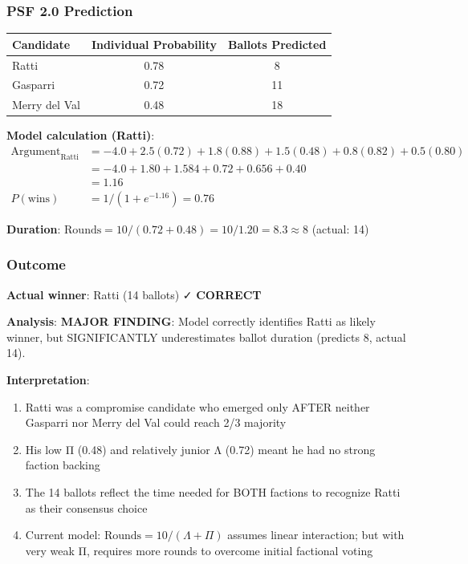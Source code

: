 \subsubsection{PSF 2.0 Prediction}

\begin{center}
\begin{tabular}{lcc}
\toprule
\textbf{Candidate} & \textbf{Individual Probability} & \textbf{Ballots Predicted} \\
\midrule
Ratti & 0.78 & 8 \\
Gasparri & 0.72 & 11 \\
Merry del Val & 0.48 & 18 \\
\bottomrule
\end{tabular}
\end{center}

\textbf{Model calculation (Ratti)}:
\begin{equation}
\begin{split}
\text{Argument}_{\text{Ratti}} &= -4.0 + 2.5(0.72) + 1.8(0.88) + 1.5(0.48) + 0.8(0.82) + 0.5(0.80) \\
&= -4.0 + 1.80 + 1.584 + 0.72 + 0.656 + 0.40 \\
&= 1.16 \\
P(\text{wins}) &= 1 / (1 + e^{-1.16}) = 0.76
\end{split}
\end{equation}

\textbf{Duration}: $\text{Rounds} = 10 / (0.72 + 0.48) = 10 / 1.20 = 8.3 \approx 8$ (actual: 14)

\subsubsection{Outcome}

\textbf{Actual winner}: Ratti (14 ballots) ✓ \textbf{CORRECT}

\textbf{Analysis}: \textbf{MAJOR FINDING}: Model correctly identifies Ratti as likely winner, but SIGNIFICANTLY underestimates ballot duration (predicts 8, actual 14).

\textbf{Interpretation}:
\begin{enumerate}
    \item Ratti was a compromise candidate who emerged only AFTER neither Gasparri nor Merry del Val could reach 2/3 majority
    \item His low Π (0.48) and relatively junior Λ (0.72) meant he had no strong faction backing
    \item The 14 ballots reflect the time needed for BOTH factions to recognize Ratti as their consensus choice
    \item Current model: $\text{Rounds} = 10/(\Lambda + \Pi)$ assumes linear interaction; but with very weak Π, requires more rounds to overcome initial factional voting
\end{enumerate}

